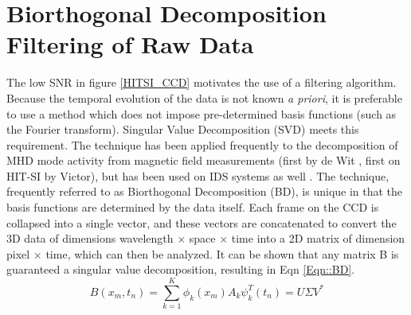	\section{Biorthogonal Decomposition Filtering of Raw Data}\label{sec::BD}
	\hspace{4ex}The low SNR in figure \ref{HITSI_CCD} motivates the use of a filtering algorithm. Because the temporal evolution of the data is not known \textit{a priori}, it is preferable to use a method which does not impose pre-determined basis functions (such as the Fourier transform). Singular Value Decomposition (SVD) meets this requirement. The technique has been applied frequently to the decomposition of MHD mode activity from magnetic field measurements (first by de Wit \cite{de1994biorthogonal}, first on HIT-SI by Victor\cite{BVictor}), but has been used on IDS systems as well \cite{fenzi20012d}. The technique, frequently referred to as Biorthogonal Decomposition (BD), is unique in that the basis functions are determined by the data itself. Each frame on the CCD is collapsed into a single vector, and these vectors are concatenated to convert the 3D data of dimensions wavelength $\times$ space $\times$ time into a 2D matrix of dimension pixel $\times$ time, which can then be analyzed. It can be shown\cite{kutz2013data} that any matrix B is guaranteed a singular value decomposition, resulting in Eqn \ref{Eqn::BD}.
	\begin{equation}\label{Eqn::BD}
	B(x_m,t_n)= \sum^K_{k=1}\phi_k(x_m)A_k\psi_k^T(t_n) = U\Sigma{V^*}
	\end{equation}
